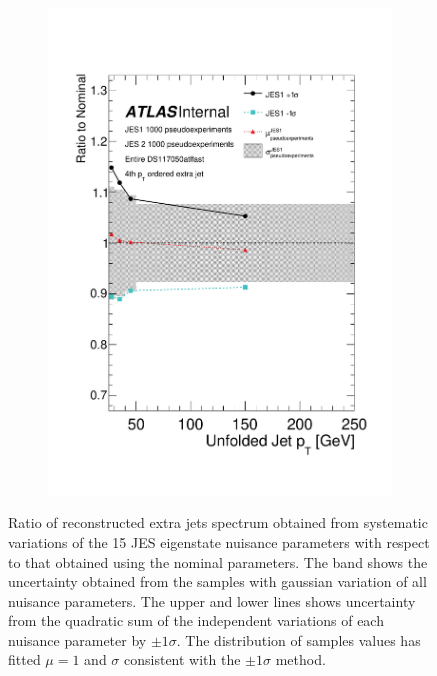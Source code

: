\begin{figure}
\begin{subfigure}[]{0.45\textwidth}
\includegraphics[width=\textwidth]{fig/UnfoldSys/Toy/JES1VarBandRatioJet3.pdf}
\end{subfigure}
\caption{Ratio of reconstructed extra jets spectrum obtained from systematic variations of the 15 JES eigenstate nuisance parameters with respect to that obtained using the nominal parameters. The band shows the uncertainty obtained from the samples with gaussian variation of all nuisance parameters. The upper and lower lines shows uncertainty from the quadratic sum of the independent variations of each nuisance parameter by $\pm 1 \sigma$. The distribution of samples values has fitted $\mu=1$ and $\sigma$ consistent with the $\pm 1 \sigma$ method. }
\label{fig:ToyJES1}
\end{figure}




